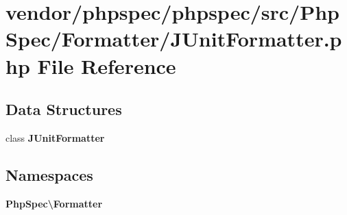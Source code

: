 \section{vendor/phpspec/phpspec/src/\+Php\+Spec/\+Formatter/\+J\+Unit\+Formatter.php File Reference}
\label{_j_unit_formatter_8php}
\subsection*{Data Structures}
\begin{DoxyCompactItemize}
\item 
class {\bf J\+Unit\+Formatter}
\end{DoxyCompactItemize}
\subsection*{Namespaces}
\begin{DoxyCompactItemize}
\item 
 {\bf Php\+Spec\textbackslash{}\+Formatter}
\end{DoxyCompactItemize}
